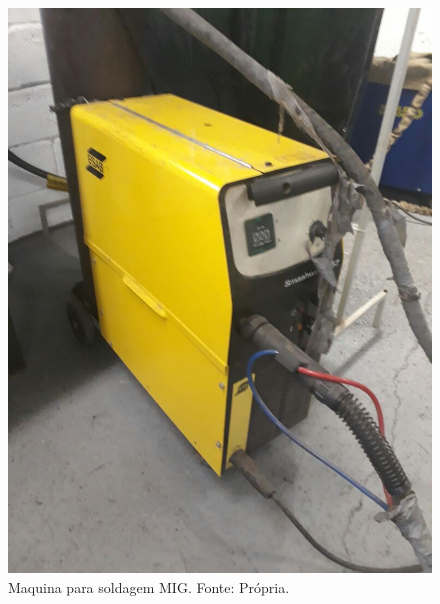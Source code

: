   \begin{figure}[H]
    \centering
    \includegraphics[scale= 0.2]{figuras/estrutura/maquina-soldagem.jpg}
    \caption{Maquina para soldagem MIG. Fonte: Própria.}
    \label{modelagem}
  \end{figure}

